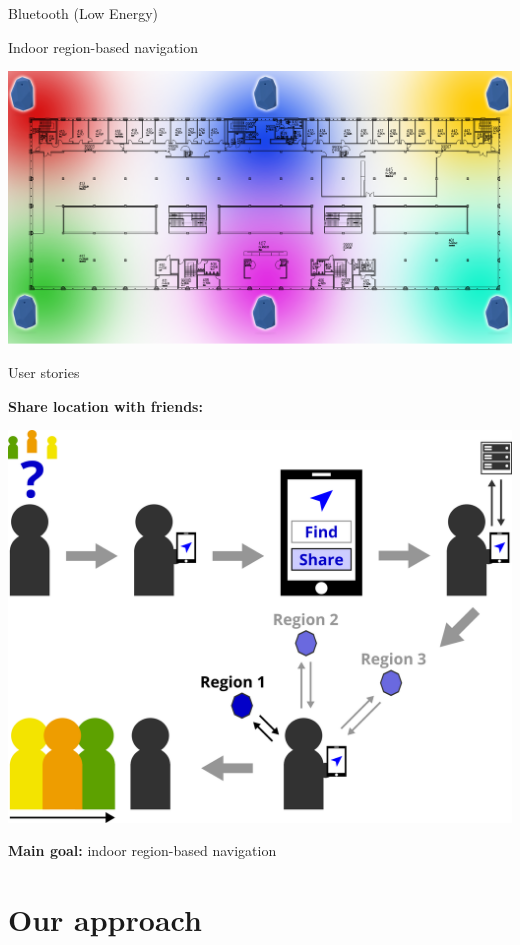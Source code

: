 \documentclass[11pt]{beamer}
\begin{document}
\begin{frame}{Bluetooth (Low Energy)}
	
	\large Indoor region-based navigation
	\begin{center}
	
		\includegraphics[width=\textwidth]{regions}
	
	\end{center}

\end{frame}

\begin{frame}{User stories}
    
    \textbf{Share location with friends:}

	\begin{center}
	
		\includegraphics[width=.6\textwidth]{user-story}
	
	\end{center}
    
    \textbf{Main goal:} indoor region-based navigation

\end{frame}

\section{Our approach}
\end{document}
